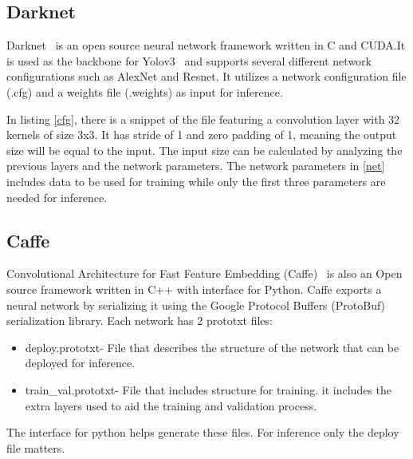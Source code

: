 \subsection{Darknet}

Darknet~\cite{darknet} is an open source neural network framework written in C
and CUDA.It is used as the backbone for Yolov3~\cite{yolov3} and supports
several different network configurations such as AlexNet and Resnet.  It
utilizes a network configuration file (.cfg) and a weights file (.weights) as
input for inference.



In listing \ref{cfg}, there is a snippet of the file featuring a convolution
layer with 32 kernels of size 3x3. It has stride of 1 and zero padding of 1,
meaning the output size will be equal to the input. The input size can be
calculated by analyzing the previous layers and the network parameters. The
network parameters in \ref{net} includes data to be used for training while only
the first three parameters are needed for inference.




\subsection{Caffe}

Convolutional Architecture for Fast Feature Embedding (Caffe)~\cite{caffe} is
also an Open source framework written in C++ with interface for Python.  Caffe
exports a neural network by serializing it using the Google Protocol Buffers
(ProtoBuf) serialization library. Each network has 2 prototxt files:
\begin{itemize}
    \item deploy.prototxt- File that describes the structure of the network that
      can be deployed for inference.
    \item train\_val.prototxt- File that includes structure for training.  it
      includes the extra layers used to aid the training and validation process.
\end{itemize}

The interface for python helps generate these files. For inference only the
deploy file matters.


